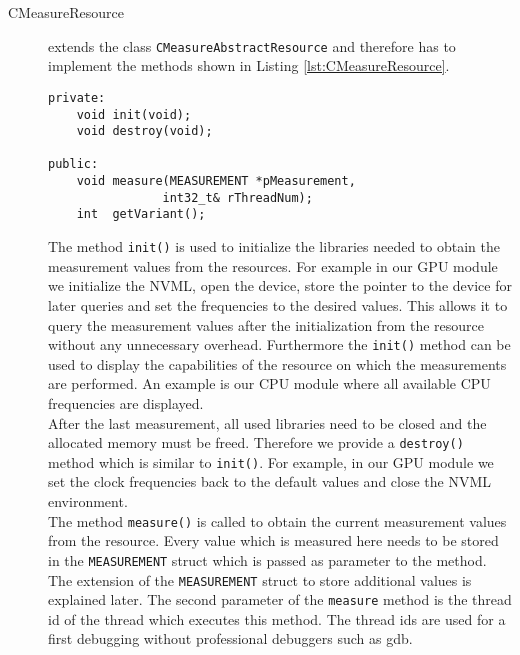 \begin{description}
	\item[CMeasureResource] extends the class \texttt{CMeasureAbstractResource} and therefore has to implement the methods shown in Listing \ref{lst:CMeasureResource}. 
	\begin{lstlisting}[caption={Methods of the \texttt{CMeasureResource} class that programmers have to implement in order to support a new resource. \added[id=ck]{Listing aktualisiert.}}, label=lst:CMeasureResource]
private:
	void init(void);
	void destroy(void);
	
public:
	void measure(MEASUREMENT *pMeasurement, 
				int32_t& rThreadNum);
	int  getVariant();
	\end{lstlisting}
	The method \texttt{init()} is used to initialize the libraries needed to obtain the measurement values from the resources. For example in our GPU module we initialize the NVML, open the device, store the pointer to the device for later queries and set the frequencies to the desired values. This allows it to query the measurement values after the initialization from the resource without any unnecessary overhead. Furthermore the \texttt{init()} method can be used to display the capabilities of the resource on which the measurements are performed. An example is our CPU module where all available CPU frequencies are displayed.\\
	After the last measurement, all used libraries need to be closed and the allocated memory must be freed. Therefore we provide a \texttt{destroy()} method which is similar to \texttt{init()}. For example, in our GPU module we set the clock frequencies back to the default values and close the NVML environment.\\
	The method \texttt{measure()} is called to obtain the current measurement values from the resource. Every value which is measured here needs to be stored in the \texttt{MEASUREMENT} struct which is passed as parameter to the method. The extension of the \texttt{MEASUREMENT} struct to store additional values is explained later. The second parameter of the \texttt{measure} method is the thread id of the thread which executes this method. The thread ids are used for a first debugging without professional debuggers such as gdb. 

\end{description}
